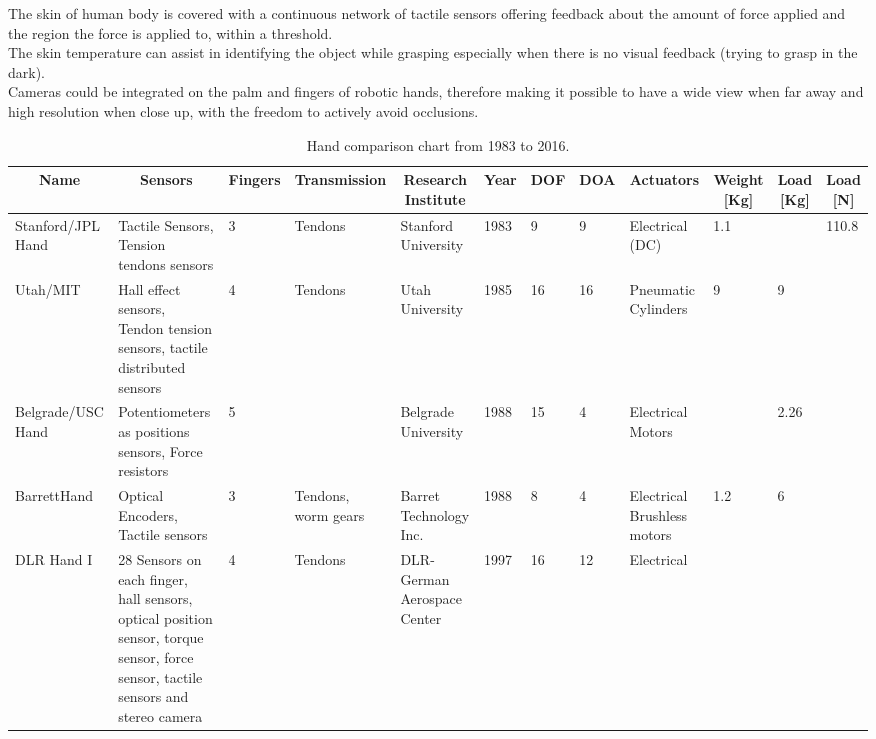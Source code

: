 \documentclass[a4paper, 10pt, conference]{ieeeconf}      %
\begin{document}
The skin of human body is covered with a continuous network of tactile sensors offering feedback about the amount of force applied and the region the force is applied to, within a threshold.\\
The skin temperature can assist in identifying the object while grasping especially when there is no visual feedback (trying to grasp in the dark).\\
Cameras could be integrated on the palm and fingers of robotic hands, therefore making it possible to have a wide view when far away and high resolution when close up, with the freedom to actively avoid occlusions.\\

\begin{landscape}
\begin{table}[]
\centering
\caption{Hand comparison chart from 1983 to 2016.}
\label{my-label}
\begin{tabular}{p{2cm}p{4cm}lp{2cm}p{2cm}lllp{2cm}lll}
\hline
\multicolumn{1}{c}{\textbf{Name}} & \multicolumn{1}{c}{\textbf{Sensors}} & \multicolumn{1}{c}{\textbf{Fingers}} & \multicolumn{1}{c}{\textbf{Transmission}} & \multicolumn{1}{c}{\textbf{Research Institute}} & \multicolumn{1}{c}{\textbf{Year}} & \multicolumn{1}{c}{\textbf{DOF}} & \multicolumn{1}{c}{\textbf{DOA}} & \multicolumn{1}{c}{\textbf{Actuators}} & \multicolumn{1}{c}{\textbf{Weight {[}Kg{]}}} & \multicolumn{1}{c}{\textbf{Load {[}Kg{]}}} & \multicolumn{1}{c}{\textbf{Load {[}N{]}}} \\ \hline
Stanford/JPL Hand & Tactile Sensors, Tension tendons sensors & 3 & Tendons & Stanford University & 1983 & 9 & 9 & Electrical (DC) & 1.1 &  & 110.8 \\ \hline
Utah/MIT & Hall effect sensors, Tendon tension sensors, tactile distributed sensors & 4 & Tendons & Utah University & 1985 & 16 & 16 & Pneumatic Cylinders & 9 & 9 &  \\ \hline
Belgrade/USC Hand & Potentiometers as positions sensors, Force resistors & 5 &  & Belgrade University & 1988 & 15 & 4 & Electrical Motors &  & 2.26 &  \\ \hline
BarrettHand & Optical Encoders, Tactile sensors & 3 & Tendons, worm gears & Barret Technology Inc. & 1988 & 8 & 4 & Electrical Brushless motors & 1.2 & 6 &  \\ \hline
DLR Hand I & 28 Sensors on each finger, hall sensors, optical position sensor, torque sensor, force sensor, tactile sensors and stereo camera & 4 & Tendons & DLR-German Aerospace Center & 1997 & 16 & 12 & Electrical &  &  &  \\ \hline

\end{tabular}
\end{table}
\end{landscape}
\end{document}
